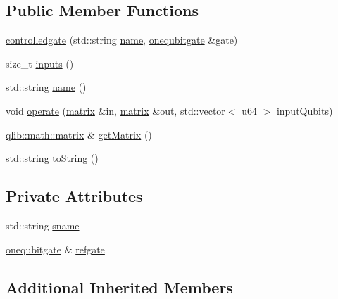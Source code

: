 \subsection*{Public Member Functions}
\begin{DoxyCompactItemize}
\item 
\hyperlink{classqlib_1_1quantum_1_1gates_1_1controlledgate_abe6d1d959a5a781739fe962551d013e7}{controlledgate} (std\+::string \hyperlink{classqlib_1_1quantum_1_1gates_1_1controlledgate_a7fb8875c83106b35d733cc96b312b957}{name}, \hyperlink{classqlib_1_1quantum_1_1gates_1_1onequbitgate}{onequbitgate} \&gate)
\item 
size\+\_\+t \hyperlink{classqlib_1_1quantum_1_1gates_1_1controlledgate_adb544cb10cd5f8836e331102f7c7e9d6}{inputs} ()
\item 
std\+::string \hyperlink{classqlib_1_1quantum_1_1gates_1_1controlledgate_a7fb8875c83106b35d733cc96b312b957}{name} ()
\item 
void \hyperlink{classqlib_1_1quantum_1_1gates_1_1controlledgate_aec6e423cc6ae442c5c3c5dc04581959e}{operate} (\hyperlink{classqlib_1_1math_1_1matrix}{matrix} \&in, \hyperlink{classqlib_1_1math_1_1matrix}{matrix} \&out, std\+::vector$<$ u64 $>$ input\+Qubits)
\item 
\hyperlink{classqlib_1_1math_1_1matrix}{qlib\+::math\+::matrix} \& \hyperlink{classqlib_1_1quantum_1_1gates_1_1controlledgate_a7d9d8771acebaa39b35176c04f114cb1}{get\+Matrix} ()
\item 
std\+::string \hyperlink{classqlib_1_1quantum_1_1gates_1_1controlledgate_a87b4d6e66acffc4e14eb3e39a19c4bee}{to\+String} ()
\end{DoxyCompactItemize}
\subsection*{Private Attributes}
\begin{DoxyCompactItemize}
\item 
std\+::string \hyperlink{classqlib_1_1quantum_1_1gates_1_1controlledgate_a638c7bead4c936bc0c8672a1fee4b50f}{sname}
\item 
\hyperlink{classqlib_1_1quantum_1_1gates_1_1onequbitgate}{onequbitgate} \& \hyperlink{classqlib_1_1quantum_1_1gates_1_1controlledgate_a8712f70ae76ec442aebad49109ddea97}{refgate}
\end{DoxyCompactItemize}
\subsection*{Additional Inherited Members}


